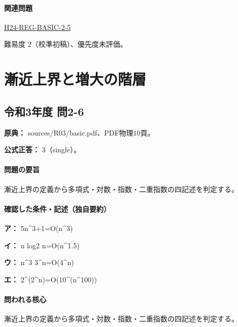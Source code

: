 \paragraph{関連問題} \hyperref[q:h24-reg-basic-2-5]{H24-REG-BASIC-2-5}

\par 難易度 2（校準初稿）、優先度未評価。

\section{漸近上界と増大の階層}

\subsection{令和3年度 問2-6}
\label{q:r03-reg-basic-2-6}

\noindent\textbf{原典：} sources/R03/basic.pdf、PDF物理10頁。

\textbf{公式正答：} 3（single）。

\paragraph{問題の要旨} 漸近上界の定義から多項式・対数・指数・二重指数の四記述を判定する。

\paragraph{確認した条件・記述（独自要約）}\mbox{}\par

\noindent\textbf{ア：} 5n\textasciicircum{}3+1=\allowbreak{}O(n\textasciicircum{}3)\par

\noindent\textbf{イ：} n log2 n=\allowbreak{}O(n\textasciicircum{}1.5)\par

\noindent\textbf{ウ：} n\textasciicircum{}3 3\textasciicircum{}n=\allowbreak{}O(4\textasciicircum{}n)\par

\noindent\textbf{エ：} 2\textasciicircum{}(2\textasciicircum{}n)=\allowbreak{}O(10\textasciicircum{}(n\textasciicircum{}100))\par

\paragraph{問われる核心} 漸近上界の定義から多項式・対数・指数・二重指数の四記述を判定する。

